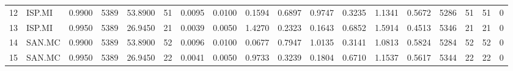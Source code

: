 \begin{table}
\begin{tabular}{llrrrrrrrrrrrrrrrr}
12 & ISP.MI & 0.9900 & 5389 & 53.8900 & 51 & 0.0095 & 0.0100 & 0.1594 & 0.6897 & 0.9747 & 0.3235 & 1.1341 & 0.5672 & 5286 & 51 & 51 & 0 \\
13 & ISP.MI & 0.9950 & 5389 & 26.9450 & 21 & 0.0039 & 0.0050 & 1.4270 & 0.2323 & 0.1643 & 0.6852 & 1.5914 & 0.4513 & 5346 & 21 & 21 & 0 \\
14 & SAN.MC & 0.9900 & 5389 & 53.8900 & 52 & 0.0096 & 0.0100 & 0.0677 & 0.7947 & 1.0135 & 0.3141 & 1.0813 & 0.5824 & 5284 & 52 & 52 & 0 \\
15 & SAN.MC & 0.9950 & 5389 & 26.9450 & 22 & 0.0041 & 0.0050 & 0.9733 & 0.3239 & 0.1804 & 0.6710 & 1.1537 & 0.5617 & 5344 & 22 & 22 & 0 \\
\bottomrule
\end{tabular}
\end{table}
